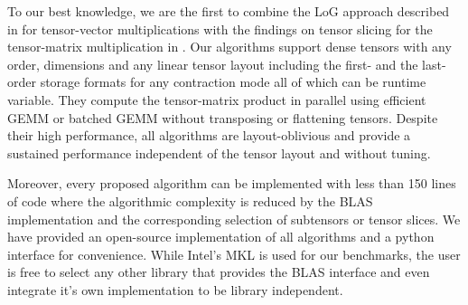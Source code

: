 To our best knowledge, we are the first to combine the LoG approach described in \citep{bassoy:2019:ttv, pawlowski:2019:morton.tensor.computations} for tensor-vector multiplications with the findings on tensor slicing for the tensor-matrix multiplication in \citep{li:2015:input}.
Our algorithms support dense tensors with any order, dimensions and any linear tensor layout including the first- and the last-order storage formats for any contraction mode all of which can be runtime variable.
They compute the tensor-matrix product in parallel using efficient GEMM or batched GEMM without transposing or flattening tensors.
Despite their high performance, all algorithms are layout-oblivious and provide a sustained performance independent of the tensor layout and without tuning.

Moreover, every proposed algorithm can be implemented with less than 150 lines of  code where the algorithmic complexity is reduced by the BLAS implementation and the corresponding selection of subtensors or tensor slices.
We have provided an open-source  implementation of all algorithms and a python interface for convenience.
While Intel's MKL is used for our benchmarks, the user is free to select any other library that provides the BLAS interface and even integrate it's own implementation to be library independent.

